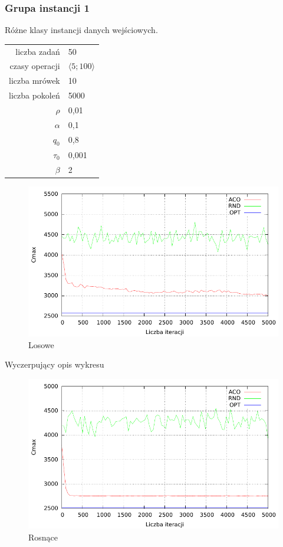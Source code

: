 \documentclass[10pt,a4paper]{article}
\begin{document}
\newpage
\subsubsection{Grupa instancji 1}
Różne klasy instancji danych wejściowych.

\begin{center}
\begin{tabular}{|r|l|}
  \hline
  liczba zadań & 50 \\
  czasy operacji & $ \langle 5;100 \rangle $  \\
  liczba mrówek & 10 \\
  liczba pokoleń & 5000 \\
  $ \rho $ & 0,01 \\
  $ \alpha $ & 0,1 \\
  $ q_0 $ & 0,8 \\
  $ \tau_0 $ & 0,001 \\
  $ \beta $ & 2 \\
  \hline
\end{tabular}
\end{center}

\begin{figure}[h]
    \centering
    \includegraphics{./figures/inst01_rnd_smooth.pdf}
    \caption{Losowe}
\end{figure}

Wyczerpujący opis wykresu


\newpage
\begin{figure}[h]
    \centering
    \includegraphics{./figures/inst02_asc_smooth.pdf}
    \caption{Rosnące}
\end{figure}
\end{document}
